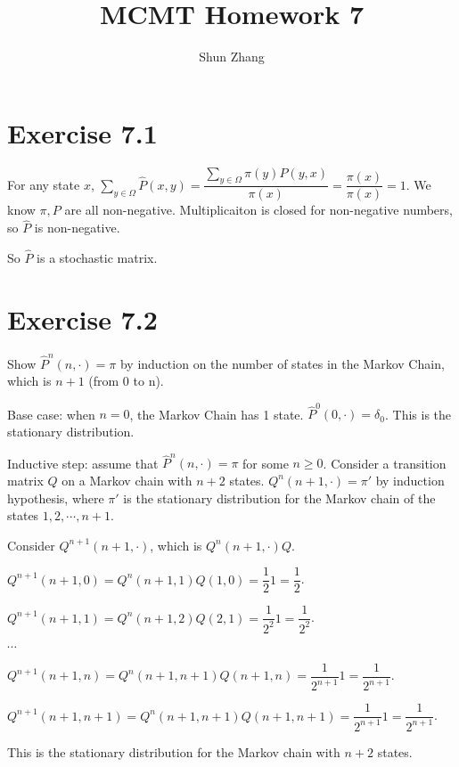 \documentclass[10pt]{article}
\title{MCMT Homework 7}
\author{Shun Zhang}
\date{}
\begin{document}
\maketitle

\section*{Exercise 7.1}

For any state $x$, 
$\sum_{y \in \Omega} \hat{P}(x, y)
= \dfrac{\sum_{y \in \Omega} \pi(y) P(y, x)}{\pi(x)}
= \dfrac{\pi(x)}{\pi(x)}
= 1
$.
We know $\pi, P$ are all non-negative. Multiplicaiton is closed for non-negative
numbers, so $\hat{P}$ is non-negative.

So $\hat{P}$ is a stochastic matrix.

\section*{Exercise 7.2}

Show $\hat{P}^n (n, \cdot) = \pi$ by induction on the number of states in the
Markov Chain, which is $n+1$ (from 0 to n).

Base case: when $n = 0$, the Markov Chain has 1 state. $\hat{P}^0 (0, \cdot) =
\delta_0$. This is the stationary distribution.

Inductive step: assume that $\hat{P}^n (n, \cdot) = \pi$ for some $n \geq 0$.
Consider a transition matrix $Q$ on a Markov chain with $n+2$ states.
$Q^n(n+1, \cdot) = \pi'$ by induction hypothesis, where $\pi'$ is the stationary
distribution for the Markov chain of the states $1, 2, \cdots, n+1$.

Consider $Q^{n+1}(n+1, \cdot)$, which is $Q^{n}(n+1, \cdot) Q$.

$Q^{n+1}(n+1, 0) = Q^{n}(n+1, 1) Q(1, 0) = \dfrac{1}{2} 1 = \dfrac{1}{2}$.

$Q^{n+1}(n+1, 1) = Q^{n}(n+1, 2) Q(2, 1) = \dfrac{1}{2^2} 1 = \dfrac{1}{2^2}$.

$\cdots$

$Q^{n+1}(n+1, n) = Q^{n}(n+1, n+1) Q(n+1, n) = \dfrac{1}{2^{n+1}} 1 =
\dfrac{1}{2^{n+1}}$.

$Q^{n+1}(n+1, n+1) = Q^{n}(n+1, n+1) Q(n+1, n+1) = \dfrac{1}{2^{n+1}} 1 =
\dfrac{1}{2^{n+1}}$.

This is the stationary distribution for the Markov chain with $n+2$ states.
\end{document}
